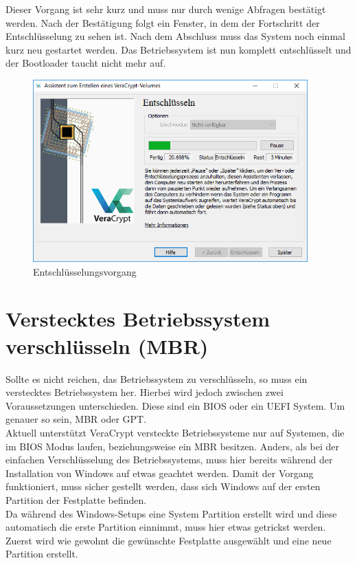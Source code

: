 \documentclass[12pt,a4paper]{scrreprt}
\begin{document}
\noindent Dieser Vorgang ist sehr kurz und muss nur durch wenige Abfragen bestätigt werden. Nach der Bestätigung folgt ein Fenster, in dem der Fortschritt der Entschlüsselung zu sehen ist. Nach dem Abschluss muss das System noch einmal kurz neu gestartet werden. Das Betriebssystem ist nun komplett entschlüsselt und der Bootloader taucht nicht mehr auf.

\begin{figure}[h]
\begin{center}
\includegraphics[width=300pt]{media/systemdecrypt2.png}
\caption{Entschlüsselungsvorgang}
\label{systemdecrypt2}
\end{center}
\end{figure}

\section{Verstecktes Betriebssystem verschlüsseln (MBR)}
Sollte es nicht reichen, das Betriebssystem zu verschlüsseln, so muss ein verstecktes Betriebssystem her. Hierbei wird jedoch zwischen zwei Voraussetzungen unterschieden. Diese sind ein BIOS oder ein UEFI System. Um genauer so sein, MBR oder GPT. \\

\noindent Aktuell unterstützt VeraCrypt versteckte Betriebssysteme nur auf Systemen, die im BIOS Modus laufen, beziehungsweise ein MBR besitzen. Anders, als bei der einfachen Verschlüsselung des Betriebssystems, muss hier bereits während der Installation von Windows auf etwas geachtet werden. Damit der Vorgang funktioniert, muss sicher gestellt werden, dass sich Windows auf der ersten Partition der Festplatte befinden.\\

\noindent Da während des Windows-Setups eine System Partition erstellt wird und diese automatisch die erste Partition einnimmt, muss hier etwas getrickst werden. Zuerst wird wie gewohnt die gewünschte Festplatte ausgewählt und eine neue Partition erstellt.
\end{document}

